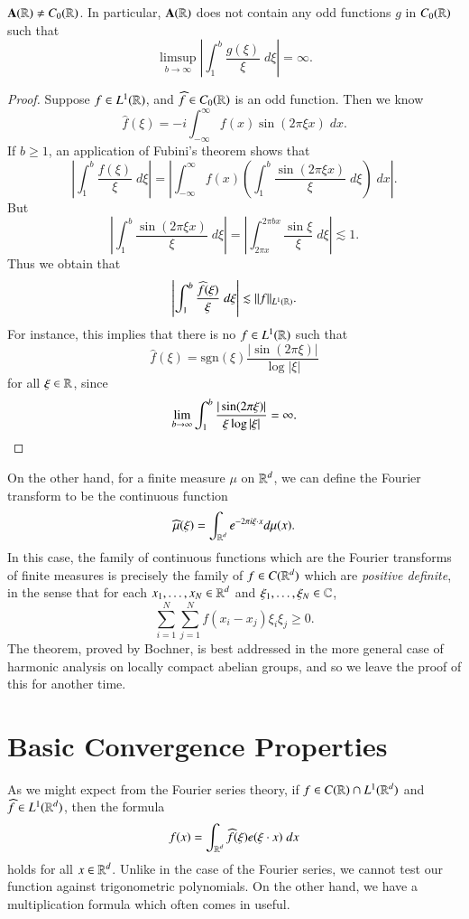 \begin{theorem}
    $\mathbf{A}(\operatorname{\mathbb{R}}) \neq C_0(\operatorname{\mathbb{R}})$. In particular, $\mathbf{A}(\operatorname{\mathbb{R}})$ does not contain any odd functions $g$ in $C_0(\operatorname{\mathbb{R}})$ such that
    \[ \limsup_{b \to \infty} \left| \int_1^b \frac{g(\xi)}{\xi}\; d\xi \right| = \infty. \]
\end{theorem}
\begin{proof}
    Suppose $f \in L^1(\operatorname{\mathbb{R}})$, and $\widehat{f} \in C_0(\operatorname{\mathbb{R}})$ is an odd function. Then we know
    \[ \widehat{f}(\xi) = -i \int_{-\infty}^\infty f(x) \sin(2 \pi \xi x)\; dx. \]
    If $b \geq 1$, an application of Fubini's theorem shows that
    \[ \left| \int_1^b \frac{\widehat{f}(\xi)}{\xi}\; d\xi \right| = \left| \int_{-\infty}^\infty f(x) \left( \int_1^b \frac{\sin(2 \pi \xi x)}{\xi}\; d\xi \right)\; dx \right|. \]
    But
    \[ \left| \int_1^b \frac{\sin(2 \pi \xi x)}{\xi}\; d\xi \right| = \left| \int_{2 \pi x}^{2 \pi b x} \frac{\sin \xi}{\xi}\; d\xi \right| \lesssim 1. \]
    Thus we obtain that
    \[ \left| \int_1^b \frac{\widehat{f}(\xi)}{\xi}\; d\xi \right| \lesssim \| f \|_{L^1(\operatorname{\mathbb{R}})}. \]
    For instance, this implies that there is no $f \in L^1(\operatorname{\mathbb{R}})$ such that
    \[ \widehat{f}(\xi) = \text{sgn}(\xi) \frac{|\sin(2 \pi \xi)|}{\log | \xi |} \]
    for all $\xi \in \operatorname{\mathbb{R}}$, since
    \[ \lim_{b \to \infty} \int_1^b \frac{|\sin(2 \pi \xi)|}{\xi \log |\xi|} = \infty. \qedhere \]
\end{proof}

On the other hand, for a finite measure $\mu$ on $\operatorname{\mathbb{R}}^d$, we can define the Fourier transform to be the continuous function
%
\[ \widehat{\mu}(\xi) = \int_{\operatorname{\mathbb{R}}^d} e^{-2 \pi i \xi \cdot x} d\mu(x). \]
%
In this case, the family of continuous functions which are the Fourier transforms of finite measures is precisely the family of $f \in C(\operatorname{\mathbb{R}}^d)$ which are \emph{positive definite}, in the sense that for each $x_1,\dots,x_N \in \operatorname{\mathbb{R}}^d$ and $\xi_1,\dots,\xi_N \in \operatorname{\mathbb{C}}$,
%
\[ \sum_{i = 1}^N \sum_{j = 1}^N f(x_i - x_j) \xi_i \xi_j \geq 0. \]
%
The theorem, proved by Bochner, is best addressed in the more general case of harmonic analysis on locally compact abelian groups, and so we leave the proof of this for another time.

\section{Basic Convergence Properties}

As we might expect from the Fourier series theory, if $f \in C(\operatorname{\mathbb{R}}) \cap L^1(\operatorname{\mathbb{R}}^d)$ and $\widehat{f} \in L^1(\operatorname{\mathbb{R}}^d)$, then the formula
%
\[ f(x) = \int_{\operatorname{\mathbb{R}}^d} \widehat{f}(\xi) e(\xi \cdot x)\; dx \]
%
holds for all $x \in \operatorname{\mathbb{R}}^d$. Unlike in the case of the Fourier series, we cannot test our function against trigonometric polynomials. On the other hand, we have a multiplication formula which often comes in useful.


